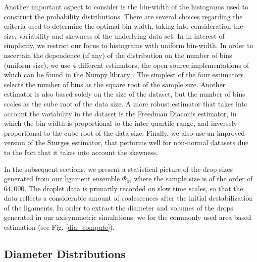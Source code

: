 Another important aspect to consider is the bin-width of the 
histograms used to construct the probability distributions. 
There are several choices regarding the criteria used to determine the optimal bin-width, 
taking into consideration the size, variability and skewness of the underlying data set. 
In in interest of simplicity, we restrict our focus to histograms with uniform bin-width. 
In order to ascertain the dependence (if any) of the distribution on the number of bins  
(uniform size), we use $4$ different estimators, the open source implementations of which
can be found in the Numpy library \cite{numpy}.
The simplest of the four estimators selects the number 
of bins as the square root of the sample size.
Another estimator is also based solely on the size of the dataset, 
but the number of bins scales as the cube root of the data size.  
A more robust estimator that takes into account the variability in the dataset
is the Freedman Diaconis estimator, in which the bin width is proportional to the 
inter quartile range, and inversely proportional to the cube root of the data size. 
Finally, we also use an improved version of the Sturges estimator, that performs 
well for non-normal datasets due to the fact that it takes into account the skewness. 

In the subsequent sections, we present a statistical picture of the drop sizes generated 
from our ligament ensemble $\Phi_0$, where the sample size is of the order of $64,000$.
The droplet data is primarily recorded on slow time scales, so that the data reflects 
a considerable amount of coalescences after the initial destabilization of the ligaments. 
In order to extract the diameter and volumes of the drops generated in our axisymmetric
simulations, we for the commonly used area based estimation (see Fig. \ref{dia_compute}).


\subsection*{Diameter Distributions}

